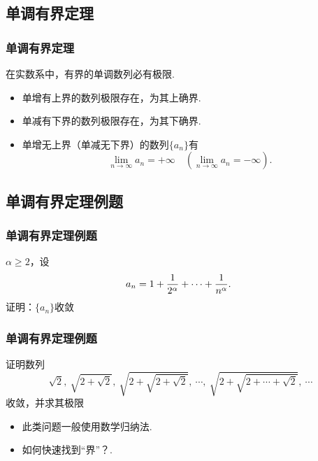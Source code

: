 \documentclass[mathserif]{beamer}
\begin{document}
\subsection{单调有界定理}

\begin{frame}[label=dandiaoyoujie]
\frametitle{单调有界定理 }
\begin{thm}
\suojin 在实数系中，有界的单调数列必有极限.
\end{thm}
\hfill\hyperlink{dandiaoyoujiezm<1>}{}
\begin{itemize}
\item[注1.\ ] 单增有上界的数列极限存在，为其上确界.
\item[注2.\ ] 单减有下界的数列极限存在，为其下确界.
\item[注3.\ ] 单增无上界（单减无下界）的数列$\{a_n\}$有$$\lim_{n\rightarrow\infty}a_{n}=+\infty\quad (\lim_{n\rightarrow\infty}a_{n}=-\infty).$$
\end{itemize}
\end{frame}




\subsection{单调有界定理例题}
\begin{frame}[label=li_1]
\frametitle{单调有界定理例题}
\begin{ex}
\suojin $\alpha\geqslant 2$，设$$a_{n}=1+\frac{1}{2^{\alpha}}+\cdots+\frac{1}{n^{\alpha}}.\ \ $$ 证明：$\{a_{n}\}$收敛\jh
\end{ex}
\hfill \hyperlink{li_1jd<1>}{}
\end{frame}



\begin{frame}[label=li_2]
\frametitle{单调有界定理例题}
\begin{ex}{\xiaowuhao
\suojin 证明数列
$$\sqrt{2},\ \sqrt{2+\sqrt{2}},\ \sqrt{2+\sqrt{2+\sqrt{2}}},\ \cdots,\ \sqrt{2+\sqrt{2+\cdots+\sqrt{2}}},\ \cdots\ $$
收敛，并求其极限\jh}
\end{ex}
\hfill  \hyperlink{li_2jd<1>}{}
\begin{itemize}
\item[注1.\ ] 此类问题一般使用数学归纳法.
\item[注2.\ ] 如何快速找到“界”？.
\end{itemize}
\end{frame}
\end{document}
